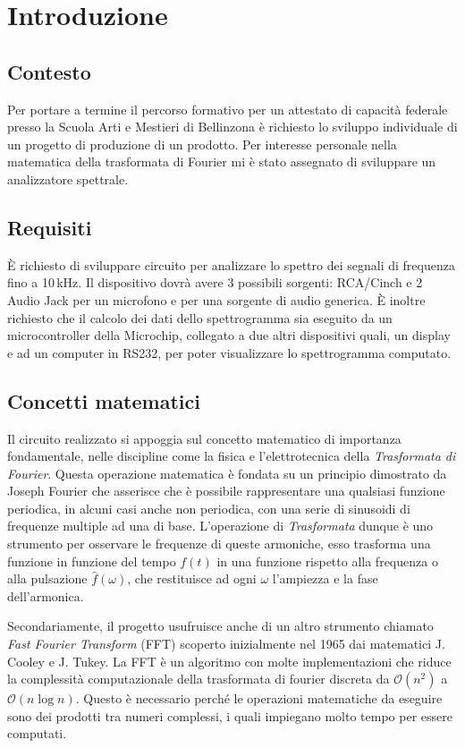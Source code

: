 \chapter{Introduzione}

\section{Contesto}
Per portare a termine il percorso formativo per un attestato di capacit\`a
federale presso la Scuola Arti e Mestieri di Bellinzona \`e richiesto lo
sviluppo individuale di un progetto di produzione di un prodotto.
Per interesse personale nella matematica della trasformata di Fourier mi \`e
stato assegnato di sviluppare un analizzatore spettrale.

\section{Requisiti}
\`E richiesto di sviluppare circuito per analizzare lo spettro dei segnali di
frequenza fino a 10\,kHz. Il dispositivo dovr\`a avere 3 possibili sorgenti:
RCA/Cinch e 2 Audio Jack per un microfono e per una sorgente di audio
generica. \`E inoltre richiesto che il calcolo dei dati dello spettrogramma
sia eseguito da un microcontroller della Microchip, collegato a due
altri dispositivi quali, un display e ad un computer in RS232, per poter
visualizzare lo spettrogramma computato.

\section{Concetti matematici}
Il circuito realizzato si appoggia sul concetto matematico di importanza
fondamentale, nelle discipline come la fisica e l'elettrotecnica della
\emph{Trasformata di Fourier}. Questa operazione matematica \`e fondata su
un principio dimostrato da Joseph Fourier che asserisce che \`e possibile
rappresentare una qualsiasi funzione periodica, in alcuni casi anche non
periodica, con una serie di sinusoidi di frequenze multiple ad una di base.
L'operazione di \emph{Trasformata} dunque \`e uno strumento per osservare
le frequenze di queste armoniche, esso trasforma una funzione in funzione del
tempo \(f(t)\) in una funzione rispetto alla frequenza o alla pulsazione
\(\hat f(\omega)\), che restituisce ad ogni \(\omega\) l'ampiezza e la fase
dell'armonica.

Secondariamente, il progetto usufruisce anche di un altro strumento chiamato
\emph{Fast Fourier Transform} (FFT) scoperto inizialmente nel 1965 dai
matematici J. Cooley e J. Tukey. La FFT \`e un algoritmo con molte
implementazioni che riduce la complessit\`a computazionale della trasformata
di fourier discreta da \(\mathcal{O}(n^2)\) a \(\mathcal{O}(n \log n)\).
Questo \`e necessario perch\'e le operazioni matematiche da eseguire sono dei
prodotti tra numeri complessi, i quali impiegano molto tempo per essere
computati.

